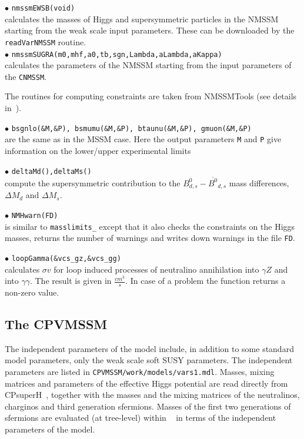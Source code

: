 \documentclass[12pt,a4paper]{article}
\begin{document}
\noindent$\bullet$ \verb|nmssmEWSB(void)|\\
calculates the masses of Higgs and supersymmetric particles in the NMSSM
starting from the weak scale input parameters. These  can be downloaded by the 
{\tt readVarNMSSM} routine.~\cite{Ellwanger:2005dv}\\   
\noindent$\bullet$ \verb|nmssmSUGRA(m0,mhf,a0,tb,sgn,Lambda,aLambda,aKappa)|\\
calculates the parameters of the NMSSM starting from the input parameters of 
the \verb|CNMSSM|.

The routines for computing constraints are taken from NMSSMTools (see details  in~\cite{Belanger:2006is}).

\noindent
$\bullet$ {\tt bsgnlo(\&M,\&P), bsmumu(\&M,\&P), btaunu(\&M,\&P),  gmuon(\&M,\&P)}\\ 
are the same as in the MSSM case.  Here the output parameters {\tt M} and {\tt P} 
give information on the lower/upper experimental limits ~\cite{Domingo:2007dx}



\noindent$\bullet$ \verb|deltaMd(),deltaMs()|\\
compute the supersymmetric contribution to the $B^0_{d,s}-\overline{B^0}_{d,s}$ mass differences, $\Delta M_d$ and $\Delta M_s$.

\noindent$\bullet$ \verb|NMHwarn(FD)|\\
is similar to {\tt masslimits\_} except that it also checks the 
constraints on the Higgs masses, returns the number of warnings and 
writes down  warnings in the file \verb|FD|.  

\noi$\bullet$ \verb|loopGamma(&vcs_gz,&vcs_gg)|\\
calculates $\sigma v$ for  loop induced processes of neutralino
annihilation into $\gamma Z$ and into $\gamma \gamma$. The result is given in  
$\frac{cm^3}{s}$. In case of a problem the function returns a non-zero value. 


\subsection{The CPVMSSM}

The independent parameters of the model include,
in addition to some standard model parameters, only the weak scale soft SUSY parameters.
The independent parameters are listed in \verb|CPVMSSM/work/models/vars1.mdl|. 
Masses,
mixing matrices and parameters of the effective Higgs potential are read
directly from CPsuperH~\cite{Lee:2003nta,Lee:2007gn}, together with the masses and
the mixing matrices of the neutralinos, charginos and third generation
sfermions.  Masses of the first two generations
of sfermions are evaluated (at tree-level) within \micro~ in
terms of the independent parameters of the model.
\end{document}
